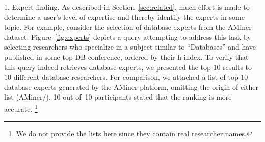  



\textsf{1. Expert finding.} As described in Section~\ref{sec:related}, much effort is made to determine a user's level of expertise and thereby identify the experts in some topic. 
For example, consider the selection of database experts from the AMiner dataset. %
Figure~\ref{fig:experts} depicts a \qlang{} query attempting to address this task by selecting researchers who specialize in a subject similar to ``Databases'' and have published in some top DB conference, ordered by their h-index.
To verify that this query indeed retrieves database experts, we presented the top-$10$ results to~$10$ different database researchers. For comparison, we attached a list of top-$10$ database experts generated by the AMiner platform, omitting the origin of either list (AMiner/\qlang{}). 10 out of~10 participants stated that the \qlang{} ranking is more accurate. \footnote{We do not provide the lists here since they contain real researcher names.}
 



